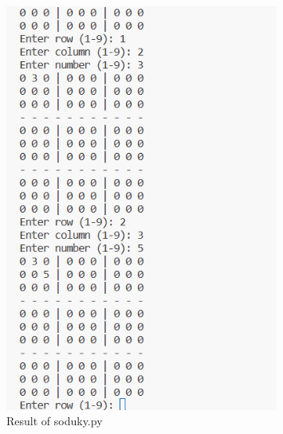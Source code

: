 \documentclass{article}
\begin{document}
\begin{figure}[h]
  \centering
  \includegraphics[width=0.8\textwidth]{result.png}
  \caption{Result of soduky.py}
\end{figure}
\end{document}
